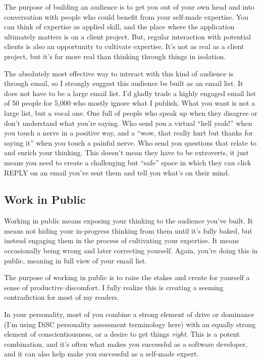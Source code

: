 The purpose of building an audience is to get you out of your own head and into conversation with people who could benefit from your self-made expertise. You can think of expertise as applied skill, and the place where the application ultimately matters is on a client project. But, regular interaction with potential clients is also an opportunity to cultivate expertise. It's not as real as a client project, but it's far more real than thinking through things in isolation.

The absolutely most effective way to interact with this kind of audience is through email, so I strongly suggest this audience be built as an email list. It does not have to be a large email list. I'd gladly trade a highly engaged email list of 50 people for 5,000 who mostly ignore what I publish. What you want is not a large list, but a vocal one. One full of people who speak up when they disagree or don't understand what you're saying. Who send you a virtual ``hell yeah!'' when you touch a nerve in a positive way, and a ``wow, that really hurt but thanks for saying it'' when you touch a painful nerve. Who send you questions that relate to and enrich your thinking. This doesn’t mean they have to be extroverts, it just means you need to create a challenging but “safe” space in which they can click REPLY on an email you’ve sent them and tell you what’s on their mind.

\subsection{Work in Public}

Working in public means exposing your thinking to the audience you've built. It means not hiding your in-progress thinking from them until it's fully baked, but instead engaging them in the process of cultivating your expertise. It means occasionally being wrong and later correcting yourself. Again, you're doing this in public, meaning in full view of your email list.

The purpose of working in public is to raise the stakes and create for yourself a sense of productive discomfort. I fully realize this is creating a seeming contradiction for most of my readers.

In your personality, most of you combine a strong element of drive or dominance (I'm using DiSC personality assessment terminology here) with an equally strong element of conscientiousness, or a desire to get things \emph{right}. This is a potent combination, and it's often what makes you successful as a software developer, and it can also help make you successful as a self-made expert.

